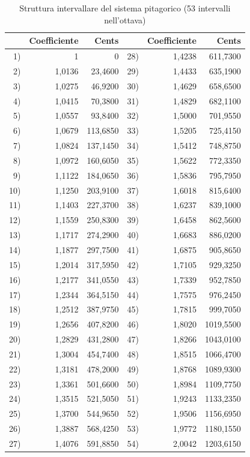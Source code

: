 \begin{table}[htbp]
  \centering\footnotesize
  \caption*{Struttura intervallare del sistema pitagorico
    (53 intervalli nell'ottava)}
  \begin{tabular}{r r r @{\qquad} r r r}
    \toprule
    & Coefficiente & Cents & & Coefficiente & Cents \\
    \midrule
    1) & 1 & 0 & 28) & 1,4238 & 611,7300 \\
    2) & 1,0136 & 23,4600 & 29) & 1,4433 & 635,1900 \\
    3) & 1,0275 & 46,9200 & 30) & 1,4629 & 658,6500 \\
    4) & 1,0415 & 70,3800 & 31) & 1,4829 & 682,1100 \\
    5) & 1,0557 & 93,8400 & 32) & 1,5000 & 701,9550 \\
    6) & 1,0679 & 113,6850 & 33) & 1,5205 & 725,4150 \\
    7) & 1,0824 & 137,1450 & 34) & 1,5412 & 748,8750 \\
    8) & 1,0972 & 160,6050 & 35) & 1,5622 & 772,3350 \\
    9) & 1,1122 & 184,0650 & 36) & 1,5836 & 795,7950 \\
    10) & 1,1250 & 203,9100 & 37) & 1,6018 & 815,6400 \\
    11) & 1,1403 & 227,3700 & 38) & 1,6237 & 839,1000 \\
    12) & 1,1559 & 250,8300 & 39) & 1,6458 & 862,5600 \\
    13) & 1,1717 & 274,2900 & 40) & 1,6683 & 886,0200 \\
    14) & 1,1877 & 297,7500 & 41) & 1,6875 & 905,8650 \\
    15) & 1,2014 & 317,5950 & 42) & 1,7105 & 929,3250 \\
    16) & 1,2177 & 341,0550 & 43) & 1,7339 & 952,7850 \\
    17) & 1,2344 & 364,5150 & 44) & 1,7575 & 976,2450 \\
    18) & 1,2512 & 387,9750 & 45) & 1,7815 & 999,7050 \\
    19) & 1,2656 & 407,8200 & 46) & 1,8020 & 1019,5500 \\
    20) & 1,2829 & 431,2800 & 47) & 1,8266 & 1043,0100 \\
    21) & 1,3004 & 454,7400 & 48) & 1,8515 & 1066,4700 \\
    22) & 1,3181 & 478,2000 & 49) & 1,8768 & 1089,9300 \\
    23) & 1,3361 & 501,6600 & 50) & 1,8984 & 1109,7750 \\
    24) & 1,3515 & 521,5050 & 51) & 1,9243 & 1133,2350 \\
    25) & 1,3700 & 544,9650 & 52) & 1,9506 & 1156,6950 \\
    26) & 1,3887 & 568,4250 & 53) & 1,9772 & 1180,1550 \\
    27) & 1,4076 & 591,8850 & 54) & 2,0042 & 1203,6150 \\
    \bottomrule
  \end{tabular}
\end{table}

